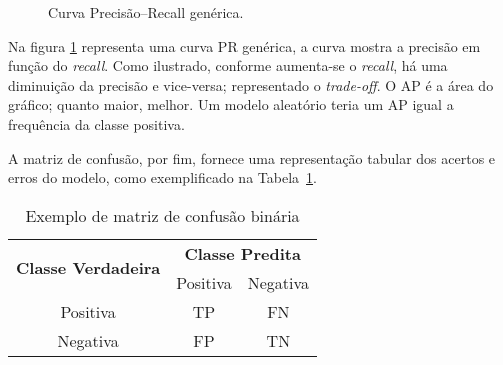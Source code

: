 \begin{figure}[H]
    \centering
    \caption{Curva Precisão–Recall genérica.}
    
    \label{fig:pr_curve_nv}
\end{figure}


Na figura \ref{fig:pr_curve_nv} representa uma curva PR genérica, a curva mostra a precisão em função do \textit{recall}. Como ilustrado,
conforme aumenta-se o \textit{recall}, há uma diminuição da precisão e vice-versa; representado o \textit{trade-off}. O AP é a área do gráfico; quanto
maior, melhor. Um modelo aleatório teria um AP igual a frequência da classe positiva.

A matriz de confusão, por fim, fornece uma representação tabular dos acertos e erros do modelo, como exemplificado na Tabela~\ref{tab:matriz_confusao}.

\begin{table}[H]
\centering
\caption{Exemplo de matriz de confusão binária}
\label{tab:matriz_confusao}
\begin{tabular}{|c|c|c|}
\hline
\multirow{2}{*}{\textbf{Classe Verdadeira}} & \multicolumn{2}{c|}{\textbf{Classe Predita}} \\ \cline{2-3} 
 & Positiva & Negativa \\ \hline
Positiva & TP & FN \\ \hline
Negativa & FP & TN \\ \hline
\end{tabular}
\end{table}

